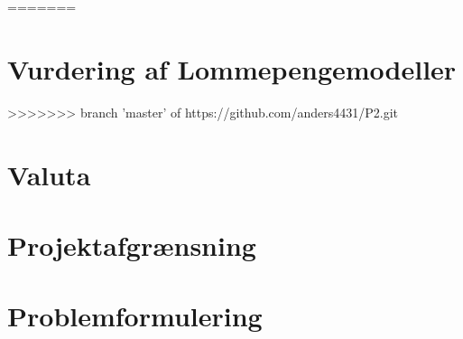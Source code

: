 =======
\section{Vurdering af Lommepengemodeller}
\label{ModelVurdering}

>>>>>>> branch 'master' of https://github.com/anders4431/P2.git

\section{Valuta}
\label{Valuta}


\section{Projektafgrænsning}


\section{Problemformulering}



%





